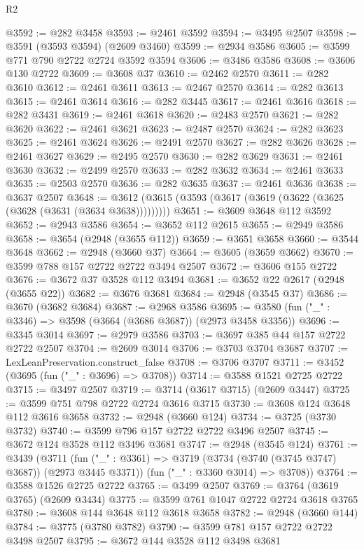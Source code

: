 \begin{lexlean}{R2}
\begin{coremodule}
@3592 := @282 @3458
@3593 := @2461 @3592
@3594 := @3495 @2507
@3598 := @3591 (@3593 @3594) (@2609 @3460)
@3599 := @2934 @3586
@3605 := @3599 @771 @790 @2722 @2724 @3592 @3594
@3606 := @3486 @3586
@3608 := @3606 @130 @2722
@3609 := @3608 @37
@3610 := @2462 @2570
@3611 := @282 @3610
@3612 := @2461 @3611
@3613 := @2467 @2570
@3614 := @282 @3613
@3615 := @2461 @3614
@3616 := @282 @3445
@3617 := @2461 @3616
@3618 := @282 @3431
@3619 := @2461 @3618
@3620 := @2483 @2570
@3621 := @282 @3620
@3622 := @2461 @3621
@3623 := @2487 @2570
@3624 := @282 @3623
@3625 := @2461 @3624
@3626 := @2491 @2570
@3627 := @282 @3626
@3628 := @2461 @3627
@3629 := @2495 @2570
@3630 := @282 @3629
@3631 := @2461 @3630
@3632 := @2499 @2570
@3633 := @282 @3632
@3634 := @2461 @3633
@3635 := @2503 @2570
@3636 := @282 @3635
@3637 := @2461 @3636
@3638 := @3637 @2507
@3648 := @3612 (@3615 (@3593 (@3617 (@3619 (@3622 (@3625 (@3628 (@3631 (@3634 @3638)))))))))
@3651 := @3609 @3648 @112 @3592
@3652 := @2943 @3586
@3654 := @3652 @112 @2615
@3655 := @2949 @3586
@3658 := @3654 (@2948 (@3655 @112))
@3659 := @3651 @3658
@3660 := @3544 @3648
@3662 := @2948 (@3660 @37)
@3664 := @3605 (@3659 @3662)
@3670 := @3599 @788 @157 @2722 @2722 @3494 @2507
@3672 := @3606 @155 @2722
@3676 := @3672 @37 @3528 @112 @3494
@3681 := @3652 @22 @2617 (@2948 (@3655 @22))
@3682 := @3676 @3681
@3684 := @2948 (@3545 @37)
@3686 := @3670 (@3682 @3684)
@3687 := @2968 @3586
@3695 := @3580 (fun ("_" : @3346) => @3598 (@3664 (@3686 @3687)) (@2973 @3458 @3356))
@3696 := @3345 @3014
@3697 := @2979 @3586
@3703 := @3697 @385 @44 @157 @2722 @2722 @2507
@3704 := @2609 @3014
@3706 := @3703 @3704 @3687
@3707 := LexLeanPreservation.construct_false
@3708 := @3706 @3707
@3711 := @3452 (@3695 (fun ("_" : @3696) => @3708))
@3714 := @3588 @1521 @2725 @2722
@3715 := @3497 @2507
@3719 := @3714 (@3617 @3715) (@2609 @3447)
@3725 := @3599 @751 @798 @2722 @2724 @3616 @3715
@3730 := @3608 @124 @3648 @112 @3616 @3658
@3732 := @2948 (@3660 @124)
@3734 := @3725 (@3730 @3732)
@3740 := @3599 @796 @157 @2722 @2722 @3496 @2507
@3745 := @3672 @124 @3528 @112 @3496 @3681
@3747 := @2948 (@3545 @124)
@3761 := @3439
    (@3711
      (fun ("_" : @3361) => @3719 (@3734 (@3740 (@3745 @3747) @3687)) (@2973 @3445 @3371))
      (fun ("_" : @3360 @3014) => @3708))
@3764 := @3588 @1526 @2725 @2722
@3765 := @3499 @2507
@3769 := @3764 (@3619 @3765) (@2609 @3434)
@3775 := @3599 @761 @1047 @2722 @2724 @3618 @3765
@3780 := @3608 @144 @3648 @112 @3618 @3658
@3782 := @2948 (@3660 @144)
@3784 := @3775 (@3780 @3782)
@3790 := @3599 @781 @157 @2722 @2722 @3498 @2507
@3795 := @3672 @144 @3528 @112 @3498 @3681

\end{coremodule}
\end{lexlean}
